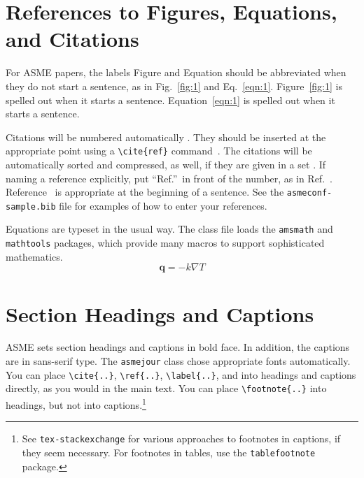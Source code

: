 \documentclass[balance,nocopyright,upint,varvw,hyphenate,barcolor=Goldenrod3,german]{asmejour}%
\begin{document}
\section{References to Figures, Equations, and Citations}

For ASME papers, the labels Figure and Equation should be abbreviated when they do not start a sentence, as in Fig.~\ref{fig:1} and Eq.~\eqref{eqn:1}. Figure~\ref{fig:1} is spelled out when it starts a sentence. Equation~\eqref{eqn:1} is spelled out when it starts a sentence. 

Citations will be numbered automatically \cite{DKE1969}. They should be inserted at the appropriate point using a \verb|\cite{ref}| command~\cite{toohey2007,gibson2008}. The citations will be automatically sorted and compressed, as well, if they are given in a set \cite{stevens1999, DKE1969, wions2006, oligaria2011, mollen2014, smith2014, apple2019}. If naming a reference explicitly, put ``Ref.''\ in front of the number, as in Ref.~\cite{smith2014}. Reference~\cite{smith2014} is appropriate at the beginning of a sentence.
See the \texttt{asmeconf-sample.bib} file for examples of how to enter your references.

Equations are typeset in the usual way.  The class file loads the \texttt{amsmath} and \texttt{mathtools} packages, which provide many macros to support sophisticated mathematics.
\begin{equation}\label{eqn:1}
\mathbf{q} = -k\nabla T
\end{equation}


\section{Section Headings and Captions}

ASME sets section headings and captions in bold face. In addition, the captions are in sans-serif type. The \texttt{asmejour} class chose appropriate fonts automatically.  You can place \verb|\cite{..}|, \verb|\ref{..}|, \verb|\label{..}|, and into headings and captions directly, as you would in the main text.  You can place \verb|\footnote{..}| into headings, but not into captions.\footnote{See \texttt{tex-stackexchange} for various approaches to footnotes in captions, if they seem necessary. For footnotes in tables, use the \texttt{tablefootnote} package.}
\end{document}
